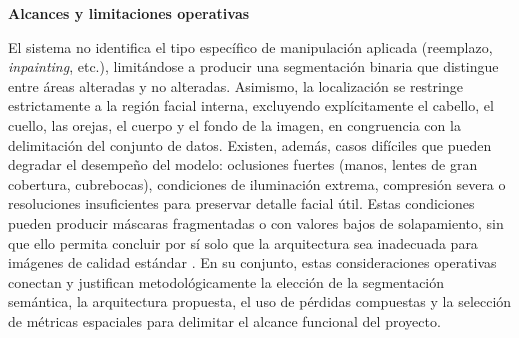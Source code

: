 \medskip\textbf{Alcances y limitaciones operativas}

El sistema no identifica el tipo específico de manipulación aplicada (reemplazo, \textit{inpainting}, etc.), limitándose a producir una segmentación binaria que distingue entre áreas alteradas y no alteradas. Asimismo, la localización se restringe estrictamente a la región facial interna, excluyendo explícitamente el cabello, el cuello, las orejas, el cuerpo y el fondo de la imagen, en congruencia con la delimitación del conjunto de datos. Existen, además, casos difíciles que pueden degradar el desempeño del modelo: oclusiones fuertes (manos, lentes de gran cobertura, cubrebocas), condiciones de iluminación extrema, compresión severa o resoluciones insuficientes para preservar detalle facial útil. Estas condiciones pueden producir máscaras fragmentadas o con valores bajos de solapamiento, sin que ello permita concluir por sí solo que la arquitectura sea inadecuada para imágenes de calidad estándar \parencite{Gao2024, LiM2025, Almotiri2024}. En su conjunto, estas consideraciones operativas conectan y justifican metodológicamente la elección de la segmentación semántica, la arquitectura propuesta, el uso de pérdidas compuestas y la selección de métricas espaciales para delimitar el alcance funcional del proyecto.